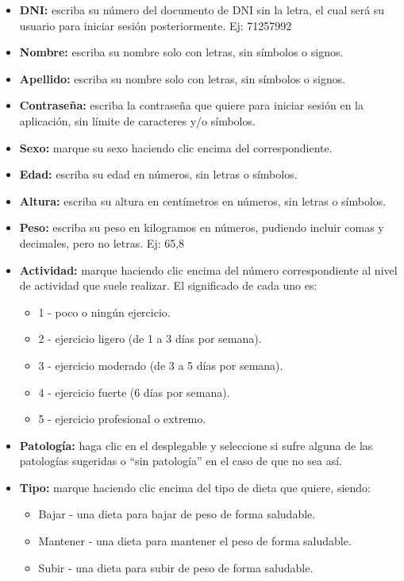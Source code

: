 \begin{itemize}
\item	\textbf{DNI:} escriba su número del documento de DNI sin la letra, el cual será su usuario para iniciar sesión posteriormente. Ej: 71257992
\item	\textbf{Nombre:} escriba su nombre solo con letras, sin símbolos o signos.
\item	\textbf{Apellido:} escriba su nombre solo con letras, sin símbolos o signos.
\item	\textbf{Contraseña:} escriba la contraseña que quiere para iniciar sesión en la aplicación, sin límite de caracteres y/o símbolos.
\item	\textbf{Sexo:} marque su sexo haciendo clic encima del correspondiente.
\item	\textbf{Edad:} escriba su edad en números, sin letras o símbolos.
\item	\textbf{Altura:} escriba su altura en centímetros en números, sin letras o símbolos.
\item	\textbf{Peso:} escriba su peso en kilogramos en números, pudiendo incluir comas y decimales, pero no letras. Ej: 65,8
\item	\textbf{Actividad:} marque haciendo clic encima del número correspondiente al nivel de actividad que suele realizar. El significado de cada uno es:
\begin{itemize}
\item	1 - poco o ningún ejercicio.
\item	2 - ejercicio ligero (de 1 a 3 días por semana).
\item	3 - ejercicio moderado (de 3 a 5 días por semana).
\item	4 - ejercicio fuerte (6 días por semana).
\item	5 - ejercicio profesional o extremo.
\end{itemize}
\item	\textbf{Patología:} haga clic en el desplegable y seleccione si sufre alguna de las patologías sugeridas o “sin patología” en el caso de que no sea así.
\item	\textbf{Tipo:} marque haciendo clic encima del tipo de dieta que quiere, siendo:
\begin{itemize}
\item	Bajar - una dieta para bajar de peso de forma saludable.
\item	Mantener - una dieta para mantener el peso de forma saludable.
\item	Subir - una dieta para subir de peso de forma saludable.
\end{itemize}
\end{itemize}


